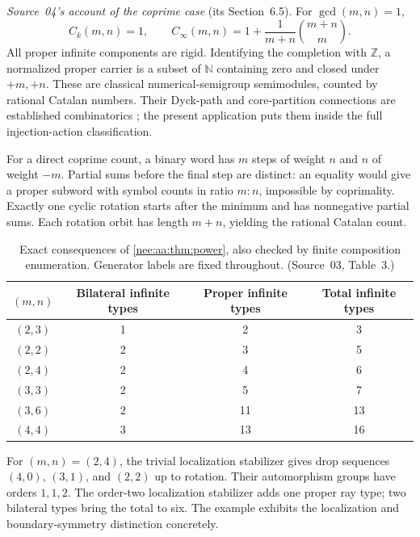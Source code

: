 \documentclass[11pt,letterpaper]{article}
\numberwithin{equation}{section}
\theoremstyle{plain}
\theoremstyle{definition}
\theoremstyle{remark}
\newcommand{\NN}{\mathbb N}
\newcommand{\ZZ}{\mathbb Z}
\begin{document}
\emph{Source~04's account of the coprime case} (its Section~6.5).
For $\gcd(m,n)=1$,
\[
C_k(m,n)=1,\qquad
C_\infty(m,n)=1+\frac1{m+n}\binom{m+n}{m}.
\]
All proper infinite components are rigid.
Identifying the completion with $\ZZ$, a normalized
proper carrier is a subset of $\NN$ containing zero
and closed under $+m,+n$. These are classical
numerical-semigroup semimodules, counted by rational
Catalan numbers. Their Dyck-path and core-partition
connections are established combinatorics
\cite{GorskyMazin,Johnson}; the present application
puts them inside the full injection-action classification.

For a direct coprime count, a binary word has $m$
steps of weight $n$ and $n$ of weight $-m$.
Partial sums before the final step are distinct: an
equality would give a proper subword with symbol counts
in ratio $m:n$, impossible by coprimality.
Exactly one cyclic rotation starts after the minimum
and has nonnegative partial sums. Each rotation orbit
has length $m+n$, yielding the rational Catalan count.

\begin{table}[tbp]
\centering
\begin{tabular}{cccc}
\toprule
$(m,n)$ & Bilateral infinite types & Proper infinite types & Total infinite types \\
\midrule
$(2,3)$ & 1 & 2 & 3 \\
$(2,2)$ & 2 & 3 & 5 \\
$(2,4)$ & 2 & 4 & 6 \\
$(3,3)$ & 2 & 5 & 7 \\
$(3,6)$ & 2 & 11 & 13 \\
$(4,4)$ & 3 & 13 & 16 \\
\bottomrule
\end{tabular}
\caption{Exact consequences of \cref{nee:aa:thm:power}, also checked by finite
composition enumeration. Generator labels are fixed throughout. (Source~03, Table~3.)}
\label{nee:aa:tab:power}
\end{table}

For $(m,n)=(2,4)$, the trivial localization stabilizer gives drop sequences
$(4,0)$, $(3,1)$, and $(2,2)$ up to rotation. Their automorphism groups have
orders $1,1,2$. The order-two localization stabilizer adds one proper ray
type; two bilateral types bring the total to six. The example exhibits the
localization and boundary-symmetry distinction concretely.
\end{document}
